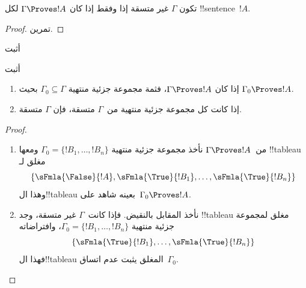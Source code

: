 \documentclass[../../../include/open-logic-section]{subfiles}
\begin{document}
\begin{prop}
تكون $\Gamma$ غير متسقة إذا وفقط إذا كان $\Gamma \Proves !A$ لكل
!!{sentence}~$!A$.
\end{prop}

\begin{proof}
تمرين.
\end{proof}

\begin{prob}
أثبت 
\end{prob}
\tagendprob

\begin{prob}
أثبت 
\end{prob}
\tagendprob

\begin{prop}[التراص]
  \begin{enumerate}
  \item إذا كان $\Gamma \Proves !A$، فثمة مجموعة جزئية منتهية $\Gamma_0
    \subseteq \Gamma$ بحيث $\Gamma_0 \Proves !A$.
  \item إذا كانت كل مجموعة جزئية منتهية من~$\Gamma$ متسقة، فإن $\Gamma$
    متسقة.
  \end{enumerate}
\end{prop}

\begin{proof}
  \begin{enumerate}
    \item من~$\Gamma \Proves !A$ نأخذ مجموعة جزئية منتهية
      $\Gamma_0 = \{!B_1, \dots, !B_n\}$ ومعها !!{tableau} مغلق لـ
      \[
      \{\sFmla{\False}{!A}, \sFmla{\True}{!B_1}, \dots, \sFmla{\True}{!B_n}\}
      \]
      وهذا ال!!{tableau} بعينه شاهد على~$\Gamma_0 \Proves !A$.
    \item نأخذ المقابل بالنقيض. فإذا كانت~$\Gamma$ غير متسقة،
      وجد !!{tableau} مغلق لمجموعة جزئية منتهية
      $\Gamma_0 = \{!B_1, \dots, !B_n\}$، وافتراضاته
      \[
      \{\sFmla{\True}{!B_1}, \dots, \sFmla{\True}{!B_n}\}
      \]
      فهذا ال!!{tableau} المغلق يثبت عدم اتساق~$\Gamma_0$.
  \end{enumerate}
\end{proof}
\end{document}
